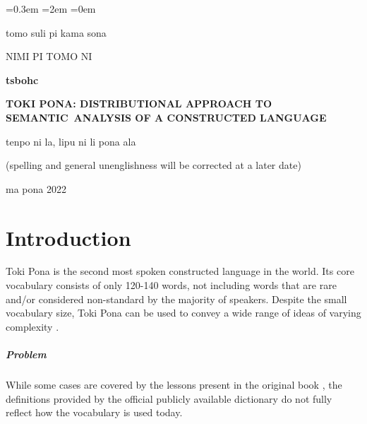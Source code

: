 \documentclass[14pt, a4paper]{extreport}
\begin{document}
\sloppy
{}\font=0.3em %
\font=2em %
\font=0em %

\renewcommand{\contentsname}{\let\clearpage\relax\chapter*{Contents}} %



\begin{titlepage}
  \begin{center}
    tomo suli pi kama sona

    NIMI PI TOMO NI

    \vfill

    \textbf{tsbohc}

    \large
    \textbf{TOKI PONA: DISTRIBUTIONAL APPROACH TO SEMANTIC~ANALYSIS OF A CONSTRUCTED LANGUAGE}

    \normalsize

    \bigskip
    \bigskip
    \bigskip
    \bigskip
    tenpo ni la, lipu ni li pona ala

    (spelling and general unenglishness will be corrected at a later date)

    \bigskip


    \vfill
    ma pona 2022

  \end{center}
\end{titlepage}
\setcounter{page}{2}
\restoregeometry
\tableofcontents

\chapter{Introduction}

Toki Pona is the second most spoken constructed language in the world. Its core vocabulary consists of only 120-140 words, not including words that are rare and/or considered non-standard by the majority of speakers. Despite the small vocabulary size, Toki Pona can be used to convey a wide range of ideas of varying complexity \parencite{iso}.
\paragraph{Problem}
While some cases are covered by the lessons present in the original book \parencite{pu}, the definitions provided by the official publicly available dictionary do not fully reflect how the vocabulary is used today.
\end{document}
